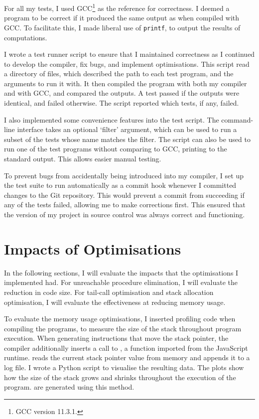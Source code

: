 \documentclass[00-main.tex]{subfiles}
\begin{document}
For all my tests, I used GCC\footnote{GCC version 11.3.1.} as the reference for correctness.
I deemed a program to be correct if it produced the same output as when compiled with GCC.
To facilitate this, I made liberal use of \texttt{printf}, to output the results of computations.

I wrote a test runner script to ensure that I maintained correctness as I continued to develop the compiler, fix bugs, and implement optimisations.
This script read a directory of  files, which described the path to each test program, and the arguments to run it with.
It then compiled the program with both my compiler and with GCC, and compared the outputs.
A test passed if the outputs were identical, and failed otherwise.
The script reported which tests, if any, failed.

I also implemented some convenience features into the test script.
The command-line interface takes an optional `filter' argument, which can be used to run a subset of the tests whose name matches the filter.
The script can also be used to run one of the test programs without comparing to GCC, printing to the standard output. This allows easier manual testing.

To prevent bugs from accidentally being introduced into my compiler, I set up the test suite to run automatically as a commit hook whenever I committed changes to the Git repository.
This would prevent a commit from succeeding if any of the tests failed, allowing me to make corrections first.
This ensured that the version of my project in source control was always correct and functioning.




\section{Impacts of Optimisations} \label{sec:eval:optimisations}

In the following sections, I will evaluate the impacts that the optimisations I implemented had.
For unreachable procedure elimination, I will evaluate the reduction in code size.
For tail-call optimisation and stack allocation optimisation, I will evaluate the effectiveness at reducing memory usage.

To evaluate the memory usage optimisations, I inserted profiling code when compiling the programs, to measure the size of the stack throughout program execution.
When generating instructions that move the stack pointer, the compiler additionally inserts a call to , a function imported from the JavaScript runtime.
 reads the current stack pointer value from memory and appends it to a log file.
I wrote a Python script to visualise the resulting data.
The plots show how the size of the stack grows and shrinks throughout the execution of the program.
 are generated using this method.
\end{document}
